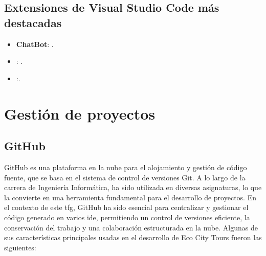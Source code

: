 	\subsection{Extensiones de Visual Studio Code más destacadas}
		\begin{itemize}
		
		\item \textbf{ChatBot}: .
		
		\item \textbf{}: .
		
		\item \textbf{}:.
		
	\end{itemize}
		

\section{Gestión de proyectos}
	\subsection{GitHub}
	GitHub es una plataforma en la nube para el alojamiento y gestión de código fuente, que se basa en el sistema de control de versiones Git. A lo largo de la carrera de Ingeniería Informática, ha sido utilizada en diversas asignaturas, lo que la convierte en una herramienta fundamental para el desarrollo de proyectos. En el contexto de este \acrshort{tfg}, GitHub ha sido esencial para centralizar y gestionar el código generado en varios \acrshort{ide}, permitiendo un control de versiones eficiente, la conservación del trabajo y una colaboración estructurada en la nube. Algunas de sus características principales usadas en el desarrollo de Eco City Tours fueron las siguientes: 
	
